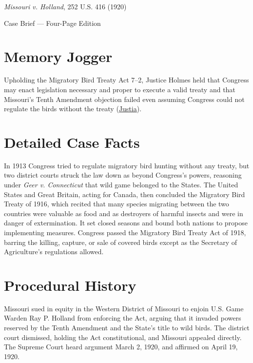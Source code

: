\documentclass[12pt]{article}
\begin{document}
\begin{center}
{\LARGE \textit{Missouri v. Holland}, 252 U.S. 416 (1920)\par}
\vspace{0.8em}
{\large Case Brief --- Four-Page Edition\par}
\end{center}
\vspace{1em}

\section{Memory Jogger}

Upholding the Migratory Bird Treaty Act 7--2, Justice Holmes held that Congress may enact legislation necessary and proper to execute a valid treaty and that Missouri's Tenth Amendment objection failed even assuming Congress could not regulate the birds without the treaty (\href{https://supreme.justia.com/cases/federal/us/252/416/}{Justia}).

\section{Detailed Case Facts}

In 1913 Congress tried to regulate migratory bird hunting without any treaty, but two district courts struck the law down as beyond Congress's powers, reasoning under \textit{Geer v. Connecticut} that wild game belonged to the States. The United States and Great Britain, acting for Canada, then concluded the Migratory Bird Treaty of 1916, which recited that many species migrating between the two countries were valuable as food and as destroyers of harmful insects and were in danger of extermination. It set closed seasons and bound both nations to propose implementing measures. Congress passed the Migratory Bird Treaty Act of 1918, barring the killing, capture, or sale of covered birds except as the Secretary of Agriculture's regulations allowed.

\section{Procedural History}

Missouri sued in equity in the Western District of Missouri to enjoin U.S. Game Warden Ray P. Holland from enforcing the Act, arguing that it invaded powers reserved by the Tenth Amendment and the State's title to wild birds. The district court dismissed, holding the Act constitutional, and Missouri appealed directly. The Supreme Court heard argument March 2, 1920, and affirmed on April 19, 1920.
\end{document}
